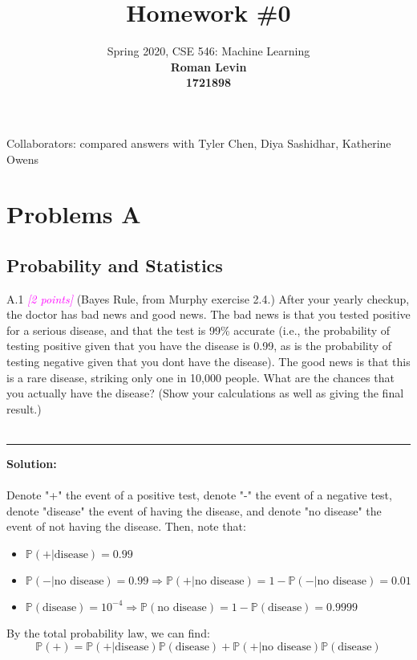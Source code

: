 \documentclass{article}
\date{{}}
\newcommand{\1}{\mathbf{1}}
\newcommand{\points}[1]{\small\textcolor{magenta}{\emph{[#1 points]}} \normalsize}
\begin{document}
\title{Homework \#0}
\author{\normalsize{Spring 2020, CSE 546: Machine Learning}\\
\normalsize{\bf Roman Levin} \\
\normalsize{\bf 1721898} \\
}
\maketitle
Collaborators: compared answers with Tyler Chen, Diya Sashidhar, Katherine Owens
\section*{Problems A}
\subsection*{Probability and Statistics}
A.1 \points{2} (Bayes Rule, from Murphy exercise 2.4.) After your yearly checkup, the doctor has bad news and good news. The bad news is that you tested positive for a serious disease, and that the test is 99\% accurate (i.e., the probability of testing positive given that you have the disease is 0.99, as is the probability of testing negative given that you dont have the disease). The good news is that this is a rare disease, striking only one in 10,000 people. What are the chances that you actually have the disease? (Show your calculations as well as giving the final result.)\\
\\
\noindent\rule{\textwidth}{1pt}
{\bf Solution:}\\
\\
Denote "+" the event of a positive test, denote "-" the event of a negative test, denote "disease" the event of having the disease, and denote "no disease" the event of not having the disease. Then, note that:
\begin{itemize}
    \item $\mathbb{P}(+\vert \text{disease}) = 0.99$
    \item $\mathbb{P}(-\vert \text{no disease}) = 0.99 \Rightarrow \mathbb{P}(+\vert \text{no disease}) = 1 - \mathbb{P}(-\vert \text{no disease}) = 0.01$
    \item $\mathbb{P}(\text{disease}) = 10^{-4} \Rightarrow \mathbb{P}(\text{no disease}) = 1 - \mathbb{P}(\text{disease}) = 0.9999$ 
\end{itemize}
By the total probability law, we can find:
\begin{equation}\label{+}
    \mathbb{P}(+) = \mathbb{P}(+\vert \text{disease})\mathbb{P}(\text{disease}) +  \mathbb{P}(+\vert \text{no disease})\mathbb{P}(\text{disease})  
\end{equation}
\end{document}
